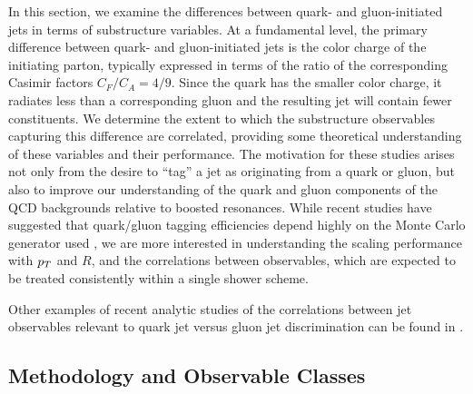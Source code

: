 In this section, we examine the differences between quark- and
gluon-initiated jets in terms of substructure variables. At a fundamental level, the primary difference between quark-  and gluon-initiated jets is the color charge of the initiating parton, typically expressed in terms of the
ratio of the corresponding Casimir factors $C_F/C_A = 4/9$.  Since the quark has the smaller color charge, it radiates less than a corresponding
gluon and the resulting jet will contain fewer constituents. We determine the extent to which the substructure observables capturing this difference are correlated, 
providing some theoretical understanding of these
variables and their performance. 
The motivation for these studies
arises not only from the
desire to ``tag'' a jet as originating from a quark or gluon, but also
to improve our  understanding of the quark and gluon components of the
QCD backgrounds relative to boosted resonances.  While recent studies
have suggested that quark/gluon tagging efficiencies depend highly on
the Monte Carlo generator used \cite{Aad:2014gea,Gallicchio:2012ez}, we are more interested in
understanding the scaling performance with $p_T$ and $R$, and the
correlations between observables, which are expected to be treated
consistently within a single shower scheme.

Other examples of recent analytic studies of the correlations between jet observables
relevant to quark jet versus gluon jet discrimination can be found in
\cite{Larkoski:2013paa, Larkoski:2014tva, Larkoski:2014pca, Procura:2014cba}.

\subsection{Methodology and Observable Classes}

